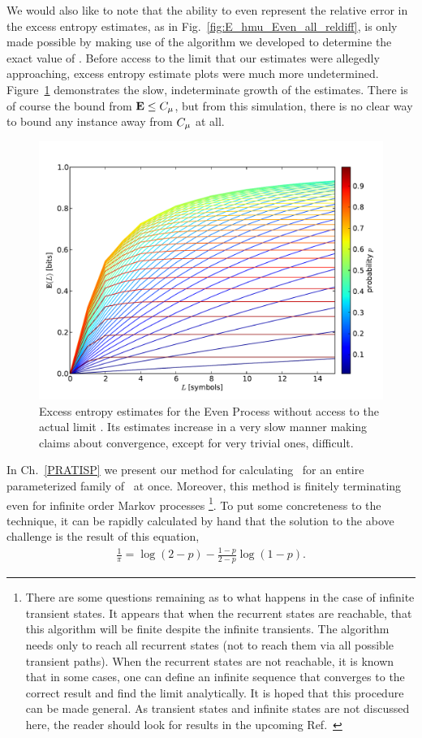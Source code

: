 We would also like to note that the ability to even represent the relative error in the excess entropy estimates, as in Fig.~\ref{fig:E_hmu_Even_all_reldiff}, is only made possible by making use of the algorithm we developed to determine the exact value of \EE. Before access to the limit that our estimates were allegedly approaching, excess entropy estimate plots were much more undetermined. Figure~\ref{fig:E_Even_all} demonstrates the slow, indeterminate growth of the estimates. There is of course the bound from  ${\bf E} \le C_\mu$, but from this simulation, there is no clear way to bound any instance away from $C_\mu$ at all.
\begin{figure}[h!]
\centering
\includegraphics[scale = 0.45]{../chapter1/figures/scripts/E_Even_all}
\caption{Excess entropy estimates for the Even Process without access to the actual limit \EE. Its estimates increase in a very slow manner making claims about convergence, except for very trivial ones, difficult.}
\label{fig:E_Even_all}
\end{figure}

In Ch.~\ref{PRATISP} we present our method for calculating \EE\ for an entire parameterized family of \eMs\ at once. Moreover, this method is finitely terminating even for infinite order Markov processes \footnote{There are some questions remaining as to what happens in the case of infinite transient states. It appears that when the recurrent states are reachable, that this algorithm will be finite despite the infinite transients. The algorithm needs only to reach all recurrent states (not to reach them via all possible transient paths). When the recurrent states are not reachable, it is known that in some cases, one can define an infinite sequence that converges to the correct result and find the limit analytically. It is hoped that this procedure can be made general. As transient states and infinite states are not discussed here, the reader should look for results in the upcoming Ref.~ }. To put some concreteness to the technique, it can be rapidly calculated by hand that the solution to the above challenge is the result of this equation,
\begin{align*}
\frac{1}{\pi} = \log(2-p) - \frac{1-p}{2-p} \log(1-p).
\end{align*}

